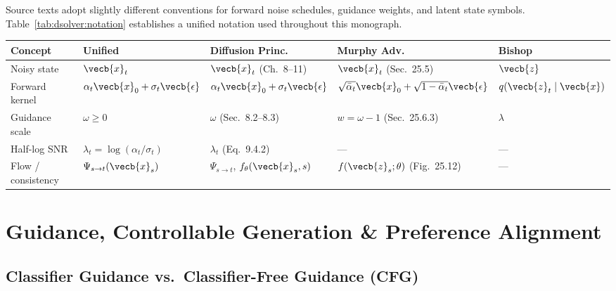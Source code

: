\documentclass[../../../../master.tex]{subfiles}
\begin{document}
\begin{crossbook}
Source texts adopt slightly different conventions for forward noise schedules, guidance weights, and latent state symbols. Table~\ref{tab:dsolver:notation} establishes a unified notation used throughout this monograph.

\vspace{0.4em}
{\footnotesize\setlength{\tabcolsep}{4pt}
\begin{tabularx}{\linewidth}{@{}l l >{\raggedright\arraybackslash}X >{\raggedright\arraybackslash}X l@{}}
  \toprule
  \textbf{Concept} & \textbf{Unified} & \textbf{Diffusion Princ.} & \textbf{Murphy Adv.} & \textbf{Bishop} \\
  \midrule
  Noisy state & $\vecb{x}_t$ & $\vecb{x}_t$ (Ch.~8--11) & $\vecb{x}_t$ (Sec.~25.5) & $\vecb{z}$ \\
  Forward kernel & $\alpha_t \vecb{x}_0 + \sigma_t \vecb{\epsilon}$ & $\alpha_t \vecb{x}_0 + \sigma_t \vecb{\epsilon}$ & $\sqrt{\bar{\alpha}_t}\vecb{x}_0 + \sqrt{1-\bar{\alpha}_t}\vecb{\epsilon}$ & $q(\vecb{z}_t \mid \vecb{x})$ \\
  Guidance scale & $\omega \ge 0$ & $\omega$ (Sec.~8.2--8.3) & $w = \omega - 1$ (Sec.~25.6.3) & $\lambda$ \\
  Half-log SNR & $\lambda_t = \log(\alpha_t/\sigma_t)$ & $\lambda_t$ (Eq.~9.4.2) & --- & --- \\
  Flow / consistency & $\Psi_{s\to t}(\vecb{x}_s)$ & $\Psi_{s\to t}$, $f_\theta(\vecb{x}_s, s)$ & $f(\vecb{z}_s; \theta)$ (Fig.~25.12) & --- \\
  \bottomrule
\end{tabularx}}
\label{tab:dsolver:notation}
\end{crossbook}

\section{Guidance, Controllable Generation \& Preference Alignment}
\label{sec:dsolver:guidance}

\subsection{Classifier Guidance vs.\ Classifier-Free Guidance (CFG)}
\end{document}
